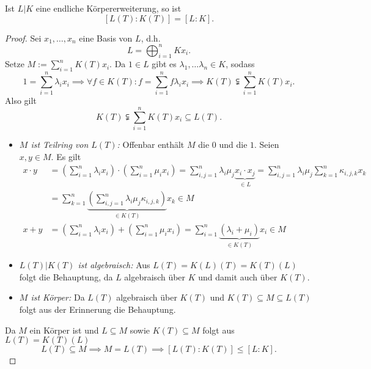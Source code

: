 \begin{lemma}\label{lemma:finiteExp}
    Ist $L|K$ eine endliche Körpererweiterung,
    so ist $$ [L(T):K(T)] = [L:K]. $$
\end{lemma}
\begin{proof}
    Sei $x_1, \ldots, x_n$ eine Basis von $L$, d.h. 
    $$ L = \bigoplus_{i=1}^n Kx_i. $$
    Setze $ M := \sum\limits_{i=1}^n K(T)x_i$. Da $1 \in L$ gibt es $\lambda_1, \ldots \lambda_n \in K$, sodass
    $$ 1 = \sum_{i=1}^n \lambda_i x_i 
        \implies \forall f \in K(T)\colon f=\sum_{i=1}^n f\lambda_ix_i 
        \implies K(T) \subsetneqq \sum_{i=1}^n K(T)x_i. $$
    Also gilt
    $$ K(T) \subsetneqq \sum_{i=1}^n K(T)x_i \subseteq L(T). $$
    \begin{itemize}
        \item \textit{$M$ ist Teilring von $L(T)$:}
        Offenbar enthält $M$ die $0$ und die $1$. Seien $x,y \in M$. Es gilt
        \begin{align*}
            x\cdot y &= \left(\sum_{i=1}^n \lambda_i x_i \right)\cdot\left(\sum_{i=1}^n \mu_i x_i\right) 
                = \sum_{i,j=1}^n \lambda_i \mu_j \underbrace{x_i \cdot x_j}_{\in L}
                =\sum_{i,j=1}^n \lambda_i \mu_j \sum_{k=1}^n \kappa_{i,j,k} x_k\\
                &= \sum_{k=1}^n \underbrace{\left(\sum_{i,j=1}^n \lambda_i \mu_j \kappa_{i,j,k}\right)}_{\in K(T)} x_k \in M\\
            x + y &= \left(\sum_{i=1}^n \lambda_i x_i \right)+\left(\sum_{i=1}^n \mu_i x_i\right)
                = \sum_{i=1}^n \underbrace{(\lambda_i + \mu_i)}_{\in K(T)}x_i \in M
        \end{align*}

        \item \textit{$L(T)|K(T)$ ist algebraisch:} Aus $L(T) = K(L)(T) = K(T)(L)$ folgt die Behauptung, 
        da $L$ algebraisch über $K$ und damit auch über $K(T)$.

        \item \textit{$M$ ist Körper:} Da $L(T)$ algebraisch über $K(T)$ und $K(T) \subseteq M \subseteq L(T)$ 
        folgt aus der Erinnerung die Behauptung.
    \end{itemize}

    Da $M$ ein Körper ist und $L \subseteq M$ sowie $K(T) \subseteq M$ folgt aus $L(T) = K(T)(L)$
    $$ L(T) \subseteq M \implies M = L(T) \implies [L(T):K(T)] \leq [L:K].$$


\end{proof}

